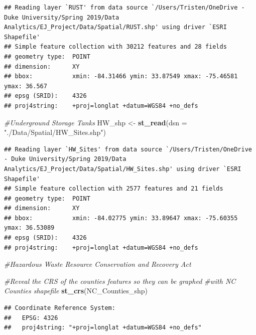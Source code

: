 \documentclass[12pt,]{article}
\newenvironment{Shaded}{\begin{snugshade}}{\end{snugshade}}
\newcommand{\KeywordTok}[1]{\textcolor[rgb]{0.13,0.29,0.53}{\textbf{#1}}}
\newcommand{\DataTypeTok}[1]{\textcolor[rgb]{0.13,0.29,0.53}{#1}}
\newcommand{\StringTok}[1]{\textcolor[rgb]{0.31,0.60,0.02}{#1}}
\newcommand{\CommentTok}[1]{\textcolor[rgb]{0.56,0.35,0.01}{\textit{#1}}}
\newcommand{\NormalTok}[1]{#1}
\begin{document}
\begin{verbatim}
## Reading layer `RUST' from data source `/Users/Tristen/OneDrive - Duke University/Spring 2019/Data Analytics/EJ_Project/Data/Spatial/RUST.shp' using driver `ESRI Shapefile'
## Simple feature collection with 30212 features and 28 fields
## geometry type:  POINT
## dimension:      XY
## bbox:           xmin: -84.31466 ymin: 33.87549 xmax: -75.46581 ymax: 36.567
## epsg (SRID):    4326
## proj4string:    +proj=longlat +datum=WGS84 +no_defs
\end{verbatim}

\begin{Shaded}
\begin{Highlighting}[]
\CommentTok{#Underground Storage Tanks}
\NormalTok{HW_shp <-}\StringTok{ }\KeywordTok{st_read}\NormalTok{(}\DataTypeTok{dsn =} \StringTok{"./Data/Spatial/HW_Sites.shp"}\NormalTok{) }
\end{Highlighting}
\end{Shaded}

\begin{verbatim}
## Reading layer `HW_Sites' from data source `/Users/Tristen/OneDrive - Duke University/Spring 2019/Data Analytics/EJ_Project/Data/Spatial/HW_Sites.shp' using driver `ESRI Shapefile'
## Simple feature collection with 2577 features and 21 fields
## geometry type:  POINT
## dimension:      XY
## bbox:           xmin: -84.02775 ymin: 33.89647 xmax: -75.60355 ymax: 36.53089
## epsg (SRID):    4326
## proj4string:    +proj=longlat +datum=WGS84 +no_defs
\end{verbatim}

\begin{Shaded}
\begin{Highlighting}[]
\CommentTok{#Hazardous Waste Resource Conservation and Recovery Act}
\end{Highlighting}
\end{Shaded}

\begin{Shaded}
\begin{Highlighting}[]
\CommentTok{#Reveal the CRS of the counties features so they can be graphed }
\CommentTok{#with NC Counties shapefile}
\KeywordTok{st_crs}\NormalTok{(NC_Counties_shp)}
\end{Highlighting}
\end{Shaded}

\begin{verbatim}
## Coordinate Reference System:
##   EPSG: 4326 
##   proj4string: "+proj=longlat +datum=WGS84 +no_defs"
\end{verbatim}
\end{document}
